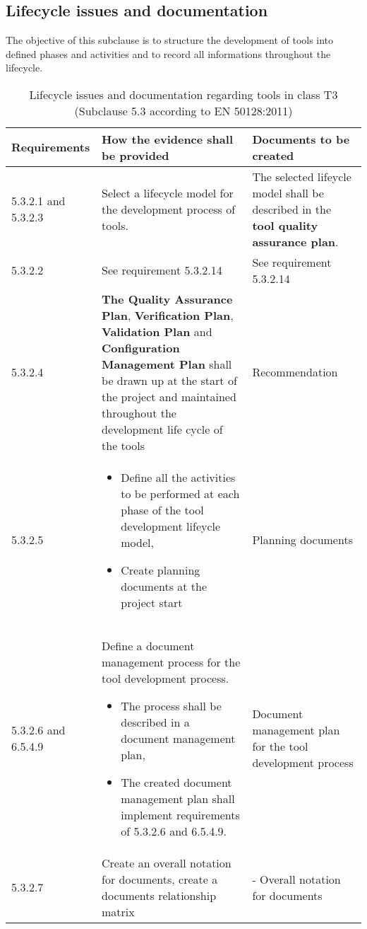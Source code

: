\documentclass{template/openetcs_report}
\begin{document}
\subsection{Lifecycle issues and documentation}
\label{SDLC}
\begin{flushleft}
The objective of this subclause is to structure the development of tools into defined phases and activities and to record all informations throughout the lifecycle.
\end{flushleft}
{\footnotesize\sffamily\centering
\begin{longtable}{|p{2cm}|p{9cm}|p{3cm}|}
\caption{Lifecycle issues and documentation regarding tools in class T3 (Subclause 5.3 according to EN 50128:2011)}\\
\hline
\bfseries Requirements & \bfseries How the evidence shall be provided & \bfseries Documents to be created\\
\hline
\hline
\endhead
\hline
\endfoot

5.3.2.1 and 5.3.2.3 & Select a lifecycle model for the development process of tools.
& The selected lifeycle model shall be described in the \textbf{tool quality assurance plan}.\\ 
\hline
5.3.2.2 & See requirement 5.3.2.14 & See requirement 5.3.2.14\\ 
\hline
5.3.2.4 & \textbf{The Quality Assurance Plan}, \textbf{Verification Plan}, \textbf{Validation Plan} and \textbf{Configuration Management Plan} shall be drawn up at the start of the project and maintained throughout the development life cycle of the tools & Recommendation\\ 
\hline
5.3.2.5 & 
\begin{itemize}\itemsep=0pt
  \item Define all the activities to be performed at each phase of the tool development lifeycle model,
  \item Create planning documents at the project start
\end{itemize} 
& Planning documents\\ 
\hline
5.3.2.6 and 6.5.4.9 & Define a document management process for the tool development process.
\begin{itemize}\itemsep=0pt
  \item The process shall be described in a document management plan,
  \item The created document management plan shall implement requirements of 5.3.2.6 and 6.5.4.9.
\end{itemize}
& Document management plan for the tool development process\\ 
\hline
5.3.2.7 & Create an overall notation for documents, create a documents relationship matrix
& 
- Overall notation for documents 


\end{longtable}}
\end{document}
